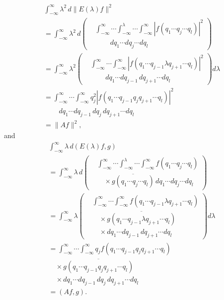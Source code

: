 \documentclass[fontsize=13pt,twoside,openany,headings=normal,parskip=false,bookmarkpackage=false,DIV=calc]{scrbook}
\begin{document}
\begin{align*}
&\int_{-\infty}^{\infty}\lambda^2\,d\|E(\lambda)f\|^2\\
&=\int_{-\infty}^{\infty}\lambda^2\,d\left(\begin{aligned}
&\int_{-\infty}^{\infty}\cdots\int_{-\infty}^{\lambda}\cdots\int_{-\infty}^{\infty}|f(q_1\cdots q_j\cdots q_l)|^2\\
&\qquad{}\,dq_1\cdots dq_j\cdots dq_l
\end{aligned}\right)\\
&=\int_{-\infty}^{\infty}\lambda^2\left(\begin{aligned}
&\int_{-\infty}^{\infty}\cdots\int_{-\infty}^{\infty}|f(q_1\cdots q_{j-1}\lambda q_{j+1}\cdots q_l)|^2\\
&\qquad{}\,dq_1\cdots dq_{j-1}\,dq_{j+1}\cdots dq_l
\end{aligned}\right)d\lambda\\
&=\int_{-\infty}^{\infty}\cdots\int_{-\infty}^{\infty}q_j^2|f(q_1\cdots q_{j-1}q_jq_{j+1}\cdots q_l)|^2\\
&\qquad{}\,dq_1\cdots dq_{j-1}\,dq_j\,dq_{j+1}\cdots dq_l\\
&=\|Af\|^2,
\end{align*}
and
\begin{align*}
&\int_{-\infty}^{\infty}\lambda\,d(E(\lambda)f,g)\\
&=\int_{-\infty}^{\infty}\lambda\,d\left(\begin{aligned}
&\int_{-\infty}^{\infty}\cdots\int_{-\infty}^{\lambda}\cdots\int_{-\infty}^{\infty}f(q_1\cdots q_j\cdots q_l)\\
&\quad\times\overline{g(q_1\cdots q_j\cdots q_l)}\,dq_1\cdots dq_j\cdots dq_l
\end{aligned}\right)\\
&=\int_{-\infty}^{\infty}\lambda\left(\begin{aligned}
&\int_{-\infty}^{\infty}\cdots\int_{-\infty}^{\infty}f(q_1\cdots q_{j-1}\lambda q_{j+1}\cdots q_l)\\
&\quad\times\overline{g(q_1\cdots q_{j-1}\lambda q_{j+1}\cdots q_l)}\\
&\quad\times dq_1\cdots dq_{j-1}\,dq_{j+1}\cdots dq_l
\end{aligned}\right)d\lambda\\
&=\int_{-\infty}^{\infty}\cdots\int_{-\infty}^{\infty}q_jf(q_1\cdots q_{j-1}q_jq_{j+1}\cdots q_l)\\
&\quad\times\overline{g(q_1\cdots q_{j-1}q_jq_{j+1}\cdots q_l)}\\
&\quad\times dq_1\cdots dq_{j-1}\,dq_j\,dq_{j+1}\cdots dq_l\\
&=(Af,g).
\end{align*}
\end{document}
